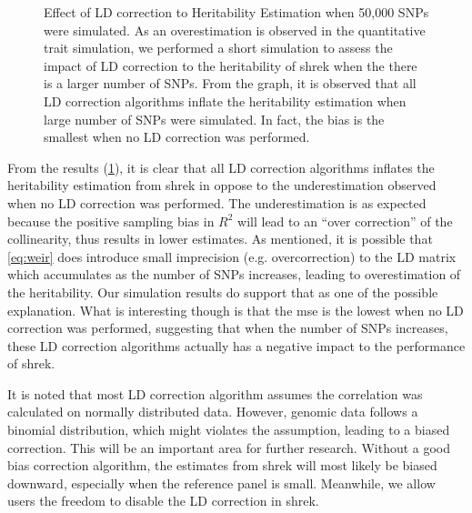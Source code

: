 \documentclass[12pt]{scrbook}
\begin{document}
\begin{figure}[t]
{		\label{fig:bigvarLDCor}
	}
	\caption[Effect of LD correction to Heritability Estimation with 50,000 SNPs]
	{Effect of LD correction to Heritability Estimation when 50,000 \glspl{SNP} were simulated.
		As an overestimation is observed in the quantitative trait simulation, we performed a short simulation to assess the impact of \gls{LD} correction to the heritability of \gls{shrek} when the there is a larger number of \glspl{SNP}.
		From the graph, it is observed that all \gls{LD} correction algorithms inflate the heritability estimation when large number of \glspl{SNP} were simulated.
		In fact, the bias is the smallest when no \gls{LD} correction was performed. 
	} 
	\label{fig:ldCorBigCom}
\end{figure}

From the results (\cref{fig:ldCorBigCom}), it is clear that all \gls{LD} correction algorithms inflates the heritability estimation from \gls{shrek} in oppose to the underestimation observed when no \gls{LD} correction was performed.
The underestimation is as expected because the positive sampling bias in $R^2$ will lead to an ``over correction'' of the collinearity, thus results in lower estimates.
As mentioned, it is possible that \cref{eq:weir} does introduce small imprecision (e.g. overcorrection) to the \gls{LD} matrix which accumulates as the number of \glspl{SNP} increases, leading to overestimation of the heritability.
Our simulation results do support that as one of the possible explanation. 
What is interesting though is that the \gls{mse} is the lowest when no \gls{LD} correction was performed, suggesting that when the number of \glspl{SNP} increases, these \gls{LD} correction algorithms actually has a negative impact to the performance of \gls{shrek}.

It is noted that most \gls{LD} correction algorithm assumes the correlation was calculated on normally distributed data. 
However, genomic data follows a binomial distribution, which might violates the assumption,  leading to a biased correction.
This will be an important area for further research.
Without a good bias correction algorithm, the estimates from \gls{shrek} will most likely be biased downward, especially when the reference panel is small.
Meanwhile, we allow users the freedom to disable the \gls{LD} correction in \gls{shrek}.
\end{document}
